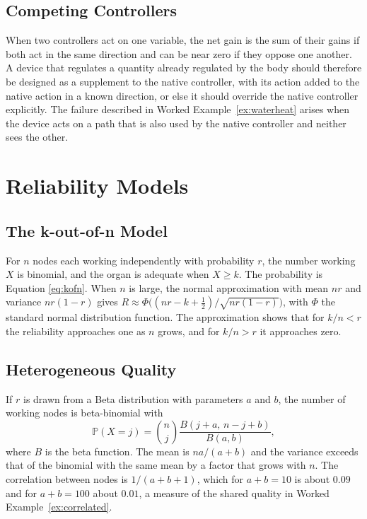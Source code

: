 \documentclass[11pt,openany]{book}
\theoremstyle{definition}
\theoremstyle{remark}
\renewcommand{\Pr}{\mathbb{P}}
\begin{document}
\section{Competing Controllers}

When two controllers act on one variable, the net gain is the sum of their gains if both act in the same direction and can be near zero if they oppose one another. A device that regulates a quantity already regulated by the body should therefore be designed as a supplement to the native controller, with its action added to the native action in a known direction, or else it should override the native controller explicitly. The failure described in Worked Example~\ref{ex:waterheat} arises when the device acts on a path that is also used by the native controller and neither sees the other.

\chapter{Reliability Models}
\label{app:reliability}

\section{The k-out-of-n Model}

For $n$ nodes each working independently with probability $r$, the number working $X$ is binomial, and the organ is adequate when $X\ge k$. The probability is Equation \eqref{eq:kofn}. When $n$ is large, the normal approximation with mean $nr$ and variance $nr(1-r)$ gives $R\approx\Phi\big((nr-k+\tfrac{1}{2})/\sqrt{nr(1-r)}\big)$, with $\Phi$ the standard normal distribution function. The approximation shows that for $k/n<r$ the reliability approaches one as $n$ grows, and for $k/n>r$ it approaches zero.

\section{Heterogeneous Quality}

If $r$ is drawn from a Beta distribution with parameters $a$ and $b$, the number of working nodes is beta-binomial with
\[
\Pr(X=j)=\binom{n}{j}\frac{B(j+a,\,n-j+b)}{B(a,b)},
\]
where $B$ is the beta function. The mean is $na/(a+b)$ and the variance exceeds that of the binomial with the same mean by a factor that grows with $n$. The correlation between nodes is $1/(a+b+1)$, which for $a+b=10$ is about $0.09$ and for $a+b=100$ about $0.01$, a measure of the shared quality in Worked Example~\ref{ex:correlated}.
\end{document}

